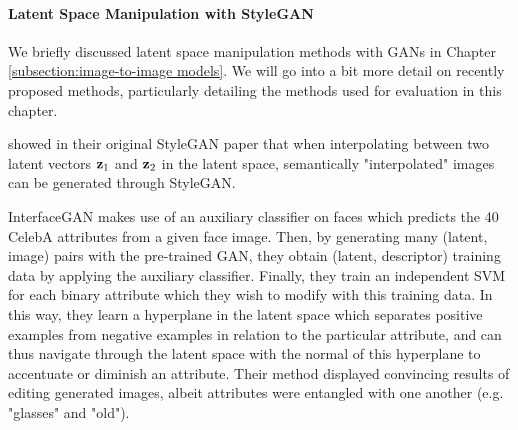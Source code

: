  



\paragraph{Latent Space Manipulation with StyleGAN}
We briefly discussed latent space manipulation methods with \ac{GAN}s in 
Chapter \ref{subsection:image-to-image models}. We will go into a bit more detail 
on recently proposed methods, particularly detailing the methods used for evaluation 
in this chapter.

\cite{karra2019stylegan} showed in their original StyleGAN paper that 
when interpolating between two latent vectors $\mathbf{z}_1$ and $\mathbf{z}_2$ in the 
latent space, semantically "interpolated" images can be generated through
StyleGAN.

InterfaceGAN \citep{shen2020} makes use of an auxiliary classifier on faces which predicts 
the 40 CelebA \citep{celeba} attributes from a given face image. 
Then, by generating many (latent, image) pairs with the pre-trained \ac{GAN},
they obtain (latent, descriptor) training data by applying the auxiliary 
classifier. Finally, they train an independent SVM \citep{svms} for each 
binary attribute which they wish to modify with this training data. In this way,
they learn a hyperplane in the latent space which separates positive examples 
from negative examples in relation to the particular attribute, and can thus 
navigate through the latent space with the normal of this hyperplane to 
accentuate or diminish an attribute. Their method displayed convincing results 
of editing generated images, albeit attributes were entangled with one 
another (e.g. "glasses" and "old").

